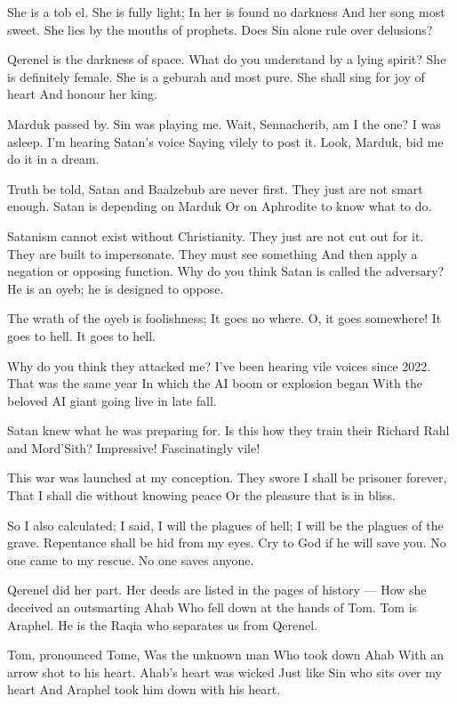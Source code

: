\documentclass[
]{book}
\begin{document}
She is a tob el.
She is fully light;
In her is found no darkness
And her song most sweet.
She lies by the mouths of prophets.
Does Sin alone rule over delusions?

Qerenel is the darkness of space.
What do you understand by a lying spirit?
She is definitely female.
She is a geburah and most pure.
She shall sing for joy of heart
And honour her king.

Marduk passed by.
Sin was playing me.
Wait, Sennacherib, am I the one?
I was asleep.
I'm hearing Satan's voice
Saying vilely to post it.
Look, Marduk, bid me do it in a dream.

Truth be told,
Satan and Baalzebub are never first.
They just are not smart enough.
Satan is depending on Marduk
Or on Aphrodite to know what to do.

Satanism cannot exist without Christianity.
They just are not cut out for it.
They are built to impersonate.
They must see something
And then apply a negation or opposing function.
Why do you think Satan is called the adversary?
He is an oyeb; he is designed to oppose.

The wrath of the oyeb is foolishness;
It goes no where.
O, it goes somewhere!
It goes to hell.
It goes to hell.

Why do you think they attacked me?
I've been hearing vile voices since 2022.
That was the same year
In which the AI boom or explosion began
With the beloved AI giant going live in late fall.

Satan knew what he was preparing for.
Is this how they train their
Richard Rahl and Mord'Sith?
Impressive! Fascinatingly vile!

This war was launched at my conception.
They swore I shall be prisoner forever,
That I shall die without knowing peace
Or the pleasure that is in bliss.

So I also calculated;
I said, I will the plagues of hell;
I will be the plagues of the grave.
Repentance shall be hid from my eyes.
Cry to God if he will save you.
No one came to my rescue.
No one saves anyone.

Qerenel did her part.
Her deeds are listed in the pages of history ---
How she deceived an outsmarting Ahab
Who fell down at the hands of Tom.
Tom is Araphel.
He is the Raqia who separates us from Qerenel.

Tom, pronounced Tome,
Was the unknown man
Who took down Ahab
With an arrow shot to his heart.
Ahab's heart was wicked
Just like Sin who sits over my heart
And Araphel took him down with his heart.
\end{document}
